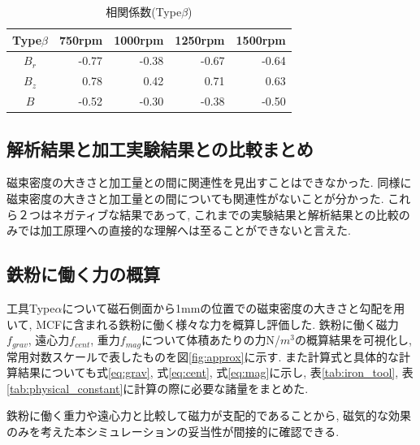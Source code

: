 \documentclass[11pt]{jarticle}
\begin{document}
  \begin{table}[H]
    \begin{tabular}{|c|r|r|r|r|} \hline 
         Type$\beta$ & 750rpm & 1000rpm & 1250rpm & 1500rpm \\ \hline
         $B_r$ & -0.77 & -0.38 & -0.67 & -0.64 \\ \hline
         $B_z$ & 0.78 & 0.42 & 0.71 & 0.63 \\ \hline
         $B$ & -0.52 & -0.30 & -0.38 & -0.50 \\ \hline
    \end{tabular}
    \centering
    \caption{相関係数(Type$\beta$)}
    \label{tab:CC_beta}
  \end{table}

  \subsection{解析結果と加工実験結果との比較まとめ}
磁束密度の大きさと加工量との間に関連性を見出すことはできなかった. 同様に磁束密度の大きさと加工量との間についても関連性がないことが分かった. これら２つはネガティブな結果であって, これまでの実験結果と解析結果との比較のみでは加工原理への直接的な理解へは至ることができないと言えた. 

  \subsection{鉄粉に働く力の概算}\label{iron_F}
工具Type$\alpha$について磁石側面から1mmの位置での磁束密度の大きさと勾配を用いて, MCFに含まれる鉄粉に働く様々な力を概算し評価した. 鉄粉に働く磁力$f_{grav}$, 遠心力$f_{cent}$, 重力$f_{mag}$について体積あたりの力{\rm N/$m^3$}の概算結果を可視化し, 常用対数スケールで表したものを図\ref{fig:approx}に示す. また計算式と具体的な計算結果についても式\ref{eq:grav}, 式\ref{eq:cent}, 式\ref{eq:mag}に示し, 表\ref{tab:iron_tool}, 表\ref{tab:physical_constant}に計算の際に必要な諸量をまとめた. \par
鉄粉に働く重力や遠心力と比較して磁力が支配的であることから, 磁気的な効果のみを考えた本シミュレーションの妥当性が間接的に確認できる. 

\end{document}
